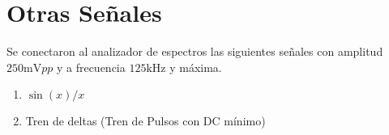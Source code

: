 \chapter{Otras Señales}
Se conectaron al analizador de espectros las siguientes
señales con amplitud $250\si{\milli\volt}pp$ y a frecuencia
$125\si{\kilo\hertz}$ y máxima.

\begin{enumerate}
    \item $\sin(x)/x$
    \item Tren de deltas (Tren de Pulsos con DC mínimo)
\end{enumerate}
